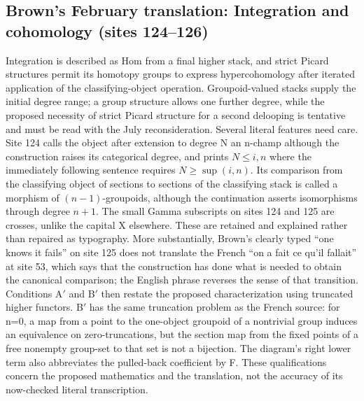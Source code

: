 \documentclass[10pt,oneside]{book}
\begin{document}
\subsection*{Brown's February translation: Integration and cohomology (sites 124--126)}
Integration is described as Hom from a final higher stack, and strict Picard structures permit its homotopy groups to express hypercohomology after iterated application of the classifying-object operation. Groupoid-valued stacks supply the initial degree range; a group structure allows one further degree, while the proposed necessity of strict Picard structure for a second delooping is tentative and must be read with the July reconsideration. Several literal features need care. Site 124 calls the object after extension to degree N an n-champ although the construction raises its categorical degree, and prints $N\leq i,n$ where the immediately following sentence requires $N\geq\sup(i,n)$. Its comparison from the classifying object of sections to sections of the classifying stack is called a morphism of $(n-1)$-groupoids, although the continuation asserts isomorphisms through degree $n+1$. The small Gamma subscripts on sites 124 and 125 are crosses, unlike the capital X elsewhere. These are retained and explained rather than repaired as typography. More substantially, Brown's clearly typed ``one knows it fails'' on site 125 does not translate the French ``on a fait ce qu'il fallait'' at site 53, which says that the construction has done what is needed to obtain the canonical comparison; the English phrase reverses the sense of that transition. Conditions A$'$ and B$'$ then restate the proposed characterization using truncated higher functors. B$'$ has the same truncation problem as the French source: for n=0, a map from a point to the one-object groupoid of a nontrivial group induces an equivalence on zero-truncations, but the section map from the fixed points of a free nonempty group-set to that set is not a bijection. The diagram's right lower term also abbreviates the pulled-back coefficient by F. These qualifications concern the proposed mathematics and the translation, not the accuracy of its now-checked literal transcription.
\end{document}
